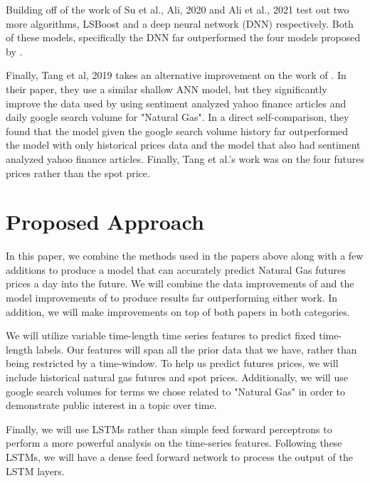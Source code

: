 \documentclass[final]{cvpr}
\begin{document}
    Building off of the work of Su et al., Ali, 2020 \cite{ali2020} and Ali et 
    al., 2021 \cite{ali2021} test out two more algorithms, LSBoost and a deep
    neural network (DNN) respectively. Both of these models, specifically the 
    DNN far outperformed the four models proposed by \cite{su}.

    Finally, Tang et al, 2019 \cite{tang} takes an alternative improvement on
    the work of \cite{su}. In their paper, they use a similar shallow ANN model,
    but they significantly improve the data used by using sentiment analyzed 
    yahoo finance articles and daily google search volume for "Natural Gas". 
    In a direct self-comparison, they found that the model given the google 
    search volume history far outperformed the model with only historical 
    prices data and the model that also had sentiment analyzed yahoo finance
    articles. Finally, Tang et al.'s work was on the four futures prices rather
    than the spot price.

\section{Proposed Approach}

    In this paper, we combine the methods used in the papers above along with
    a few additions to produce a model that can accurately predict Natural Gas
    futures prices a day into the future. We will combine the data improvements
    of \cite{tang} and the model improvements of \cite{ali2021} to produce 
    results far outperforming either work. In addition, we will make 
    improvements on top of both papers in both categories.

    We will utilize variable time-length time series features to predict fixed
    time-length labels. Our features will span all the prior data that we have,
    rather than being restricted by a time-window. To help us predict futures
    prices, we will include historical natural gas futures and spot prices.
    Additionally, we will use google search volumes for terms we chose related
    to "Natural Gas" in order to demonstrate public interest in a topic over
    time.

    Finally, we will use LSTMs rather than simple feed forward perceptrons to
    perform a more powerful analysis on the time-series features. Following 
    these LSTMs, we will have a dense feed forward network to process the output
    of the LSTM layers.
\end{document}
